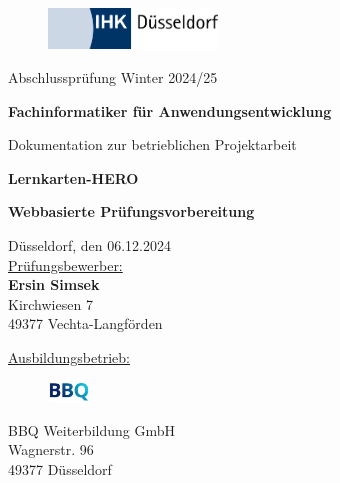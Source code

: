 \documentclass[a4paper,12pt]{book}
\begin{document}

\begin{titlepage}

\begin{center}

\begin{figure}[!ht]
    \centering
    \includegraphics[width=0.40\textwidth]{./figures/duesseldorf-ihk.png}
\end{figure}

\vspace{0.2cm}

Abschlussprüfung Winter 2024/25\\ 
\vspace{0.2cm}

{\fontsize{14}{16}\selectfont
\textbf{Fachinformatiker für Anwendungsentwicklung}\\
}

\vspace{0.2cm}
Dokumentation zur betrieblichen Projektarbeit\\
\vspace{2.4cm}

{\fontsize{24}{26}\selectfont
\textbf{Lernkarten-HERO}\\
}
\vspace{0.2cm}

{\fontsize{14}{16}\selectfont
\textbf{Webbasierte Prüfungsvorbereitung}\\
}

\vspace{2.4cm}
Düsseldorf, den 06.12.2024\\
\vspace{0.5cm}
\underline{Prüfungsbewerber:} \\
\textbf{Ersin Simsek}\\
Kirchwiesen 7\\
49377 Vechta-Langförden
\vspace{2.4cm}

\underline{Ausbildungsbetrieb:}\\

\begin{figure}[!ht]
    \centering
    \includegraphics[width=0.10\textwidth]{./figures/BBQ-Logo.png}
\end{figure}
\vspace{-0.8cm}
BBQ Weiterbildung GmbH\\
Wagnerstr. 96\\
49377 Düsseldorf
\end{center}
\end{titlepage}
\end{document}
